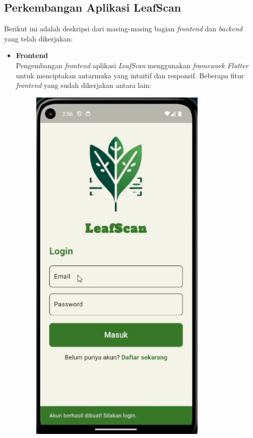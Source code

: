 \documentclass[journal,article,submit,pdftex,moreauthors]{Definitions/mdpi}
\begin{document}
\subsection{Perkembangan Aplikasi LeafScan}
Berikut ini adalah deskripsi dari masing-masing bagian \textit{frontend} dan \textit{backend} yang telah dikerjakan:

\begin{itemize}
    \item \textbf{Frontend} \\
    Pengembangan \textit{frontend} aplikasi \textit{LeafScan} menggunakan \textit{framework Flutter} untuk menciptakan antarmuka yang intuitif dan responsif. Beberapa fitur \textit{frontend} yang sudah dikerjakan antara lain:

     \begin{itemize}
        \begin{figure}[H]
            \centering
            \begin{minipage}{0.3\textwidth}
                \centering
                \includegraphics[width=0.8\textwidth]{Images/login_view.png}

\end{minipage}
\end{figure}
\end{itemize}
\end{itemize}
\end{document}
